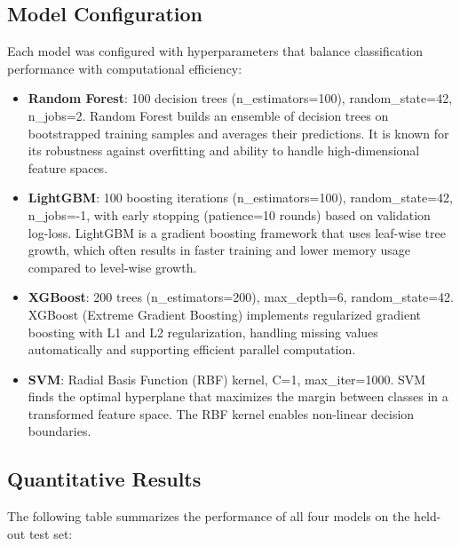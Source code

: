 \documentclass[../Main.tex]{subfiles}
\begin{document}
\subsection{Model Configuration}
\label{section:4.6.2}

Each model was configured with hyperparameters that balance classification performance with computational efficiency:

\begin{itemize}
    \item \textbf{Random Forest}: 100 decision trees (n\_estimators=100), random\_state=42, n\_jobs=2. Random Forest builds an ensemble of decision trees on bootstrapped training samples and averages their predictions. It is known for its robustness against overfitting and ability to handle high-dimensional feature spaces.
    \item \textbf{LightGBM}: 100 boosting iterations (n\_estimators=100), random\_state=42, n\_jobs=-1, with early stopping (patience=10 rounds) based on validation log-loss. LightGBM is a gradient boosting framework that uses leaf-wise tree growth, which often results in faster training and lower memory usage compared to level-wise growth.
    \item \textbf{XGBoost}: 200 trees (n\_estimators=200), max\_depth=6, random\_state=42. XGBoost (Extreme Gradient Boosting) implements regularized gradient boosting with L1 and L2 regularization, handling missing values automatically and supporting efficient parallel computation.
    \item \textbf{SVM}: Radial Basis Function (RBF) kernel, C=1, max\_iter=1000. SVM finds the optimal hyperplane that maximizes the margin between classes in a transformed feature space. The RBF kernel enables non-linear decision boundaries.
\end{itemize}

\subsection{Quantitative Results}
\label{section:4.6.3}

The following table summarizes the performance of all four models on the held-out test set:
\end{document}
